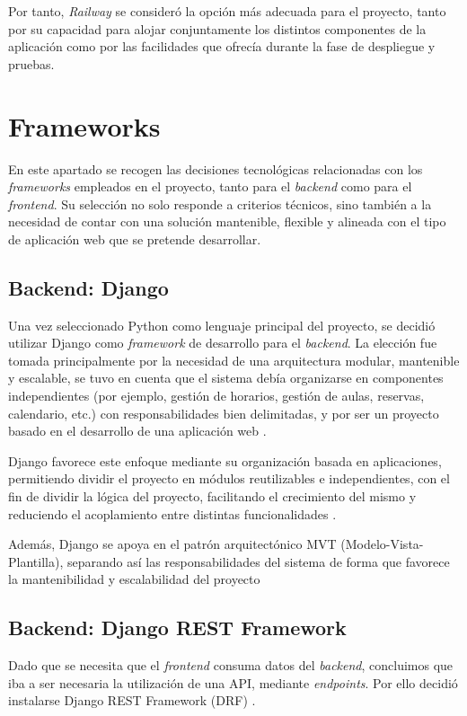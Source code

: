 Por tanto, \textit{Railway} se consideró la opción más adecuada para el proyecto, tanto por su capacidad para alojar conjuntamente los distintos componentes de la aplicación como por las facilidades que ofrecía durante la fase de despliegue y pruebas.


\section{Frameworks}

En este apartado se recogen las decisiones tecnológicas relacionadas con los \textit{frameworks} empleados en el proyecto, tanto para el \textit{backend} como para el \textit{frontend}. Su selección no solo responde a criterios técnicos, sino también a la necesidad de contar con una solución mantenible, flexible y alineada con el tipo de aplicación web que se pretende desarrollar.

\subsection{Backend: Django}
Una vez seleccionado Python como lenguaje principal del proyecto, se decidió utilizar Django como \textit{framework} de desarrollo para el \textit{backend}. La elección fue tomada principalmente por la necesidad de una arquitectura modular, mantenible y escalable, se tuvo en cuenta que el sistema debía organizarse en componentes independientes (por ejemplo, gestión de horarios, gestión de aulas, reservas, calendario, etc.) con responsabilidades bien delimitadas, y por ser un proyecto basado en el desarrollo de una aplicación web \cite{django}.

Django favorece este enfoque mediante su organización basada en aplicaciones, permitiendo dividir el proyecto en módulos reutilizables e independientes, con el fin de dividir la lógica del proyecto, facilitando el crecimiento del mismo y reduciendo el acoplamiento entre distintas funcionalidades \cite{django}.

Además, Django se apoya en el patrón arquitectónico MVT (Modelo-Vista-Plantilla), separando así las responsabilidades del sistema de forma que favorece la mantenibilidad y escalabilidad del proyecto

\subsection{Backend: Django REST Framework}

Dado que se necesita que el \textit{frontend} consuma datos del \textit{backend}, concluimos que iba a ser necesaria la utilización de una API, mediante \textit{endpoints}. Por ello decidió instalarse Django REST Framework (DRF) \cite{drf:general}.

